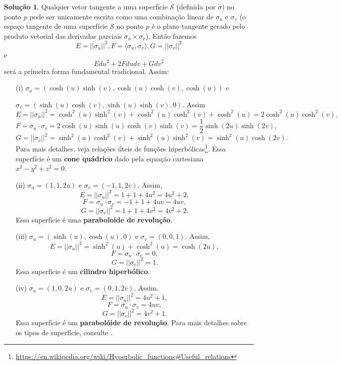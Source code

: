 \documentclass[a4paper,12pt]{article}
\newcommand{\sur}{\mathcal{S}}
\theoremstyle{exer}
\theoremstyle{definition}
\newtheorem{solution}{Solução}
\theoremstyle{plain}
\begin{document}
\begin{solution}
    Qualquer vetor tangente a uma superfície $\sur$ (definida por $\sigma$) no
    ponto $p$ pode ser unicamente escrita como uma combinação linear de
    $\sigma_u$ e $\sigma_v$ (o espaço tangente de uma superfície $\sur$ no ponto
    $p$ é o plano tangente gerado pelo produto vetorial das derivadas parciais
    $\sigma_u \times \sigma_v$). Então fazemos 
    $$
    E = ||\sigma_u||^2, F = \langle \sigma_u, \sigma_v \rangle, G = ||\sigma_v||^2
    $$
    e
    $$
    Edu^2 + 2Fdudv + Gdv^2
    $$
    será a primeira forma fundamental tradicional. Assim:
    \begin{enumerate}
        \item[(i)]  $\sigma_u = (\cosh(u)\sinh(v), \cosh(u)\cosh(v),
        \cosh(u))$ e  
        
        $\sigma_v = (\sinh(u)\cosh(v), \sinh(u)\sinh(v), 0)$. Assim 
        $$
        E = ||\sigma_u||^2 = \cosh^2(u)\sinh^2(v) + \cosh^2(u)\cosh^2(v) + \cosh^2(u) = 2\cosh^2(u)\cosh^2(v),
        $$
        $$
        F = \sigma_u\cdot\sigma_v = 2\cosh(u)\sinh(u)\cosh(v)\sinh(v) = \frac{1}{2}\sinh(2u)\sinh(2v),
        $$
        $$
        G = ||\sigma_v||^2 = \sinh^2(u)\cosh^2(v) + \sinh^2(u)\sinh^2(v) = \sinh^2(u)\cosh(2v).
        $$
        Para mais detalhes, veja relações úteis de funções
        hiperbólicas\footnote{\url{https://en.wikipedia.org/wiki/Hyperbolic_functions\#Useful_relations}}.
        Essa superfície é um {\bf cone quádrico} dado pela equação cartesiana $x^2 -
        y^2 + z^2 = 0$. 
        
        \item[(ii)] $\sigma_u = (1,1,2u)$ e $\sigma_v = (-1,1,2v)$. Assim,
        $$
        E = ||\sigma_u||^2 = 1 + 1 + 4u^2 = 4u^2 + 2,
        $$
        $$
        F = \sigma_u\cdot\sigma_v = -1 + 1 + 4uv = 4uv,
        $$
        $$
        G = ||\sigma_v||^2 = 1 + 1 + 4v^2 = 4v^2 + 2.
        $$
        Essa superfície é uma {\bf paraboloide de revolução}.

        \item[(iii)] $\sigma_u = (\sinh(u), \cosh(u), 0)$ e $\sigma_v =
        (0,0,1)$. Assim, 
        $$
        E = ||\sigma_u||^2 = \sinh^2(u) + \cosh^2(u) = \cosh(2u),
        $$
        $$
        F = \sigma_u\cdot\sigma_v = 0,
        $$
        $$
        G = ||\sigma_v||^2 = 1.
        $$
        Essa superfície é um {\bf cilindro hiperbólico}.

        \item[(iv)] $\sigma_u = (1,0,2u)$ e $\sigma_v = (0,1,2v)$. Assim, 
        $$
        E = ||\sigma_u||^2 = 4u^2 + 1,
        $$
        $$
        F = \sigma_u\cdot\sigma_v = 4uv,
        $$
        $$
        G = ||\sigma_v||^2 = 4v^2 + 1.
        $$
        Essa superfície é um {\bf parabolóide de revolução}. Para mais
        detalhes sobre os tipos de superfície, consulte \cite[Seção 5.2]{pressley}.
    \end{enumerate} 
\end{solution}
\end{document}
